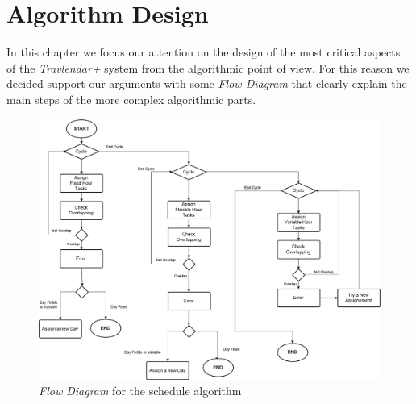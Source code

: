 \chapter{Algorithm Design}
\label{chapter:algo}
In this chapter we focus our attention on the design of the most critical aspects of the \emph{Travlendar+} system from the algorithmic point of view. For this reason we decided support our arguments with some \emph{Flow Diagram} that clearly explain the main steps of the more complex algorithmic parts.

\begin{figure}[H]
    \centering
    \includegraphics[scale=0.36]{Pictures/FlowDiagram/Algorithm.png}
    \caption{\emph{Flow Diagram} for the schedule algorithm}
    \label{fig:my_label}
\end{figure}

